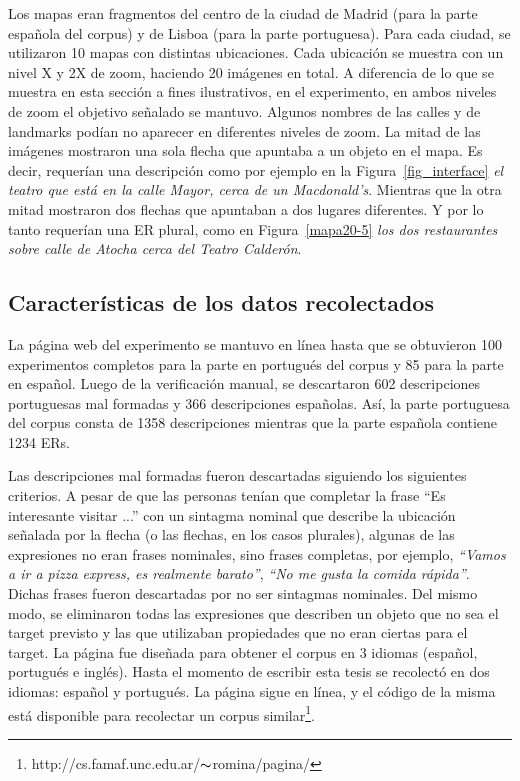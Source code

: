 Los mapas eran fragmentos del centro de la ciudad de Madrid (para la parte espa\~nola del corpus) y de Lisboa (para la parte portuguesa).
Para cada ciudad, se utilizaron 10 mapas con distintas ubicaciones. Cada ubicaci\'on se muestra con un nivel X y 2X de zoom, haciendo 20 im\'agenes en total. 
A diferencia de lo que se muestra en esta secci\'on a fines ilustrativos, en el experimento, en ambos niveles de zoom el objetivo se\~{n}alado se mantuvo. Algunos nombres de las calles y de landmarks pod\'{i}an no aparecer en diferentes niveles de zoom.
La mitad de las im\'agenes mostraron una sola flecha que apuntaba a un objeto en el mapa. Es decir, requer\'{i}an una descripci\'on como por ejemplo en la Figura~\ref{fig_interface} {\it el teatro que est\'a en la calle Mayor, cerca de un Macdonald's}. Mientras que la otra mitad mostraron dos flechas que apuntaban a dos lugares diferentes. Y por lo tanto requer\'ian una ER plural, como en Figura~\ref{mapa20-5} {\it los dos restaurantes sobre calle de Atocha cerca del Teatro Calder\'on}.


\subsection{Caracter\'isticas de los datos recolectados}
\label{sec:datos_recolectados}

La p\'agina web del experimento se mantuvo en l\'{i}nea hasta que se obtuvieron 100 experimentos completos para la parte en portugu\'es del corpus y 85  para la parte en espa\~nol. Luego de la verificaci\'on manual, se descartaron 602 descripciones portuguesas mal formadas y 366 descripciones espa\~nolas. As\'{i}, la parte portuguesa del corpus consta de 1358 descripciones mientras que la parte espa\~nola contiene 1234 ERs. 

Las descripciones mal formadas fueron descartadas siguiendo los siguientes criterios. A pesar de que las personas ten\'{i}an que completar la frase ``Es interesante visitar ...'' con un sintagma nominal que describe la ubicaci\'on se\~nalada por la flecha (o las flechas, en los casos plurales), algunas de las expresiones no eran frases nominales, sino frases completas, por ejemplo, \emph{``Vamos a ir a pizza express, es realmente barato''}, \emph{``No me gusta la comida r\'apida''}. Dichas frases fueron descartadas por no ser sintagmas nominales. Del mismo modo, se eliminaron todas las expresiones que describen un objeto que no sea el target previsto y las que utilizaban propiedades que no eran ciertas para el target. La p\'agina fue dise\~nada para obtener el corpus en 3 idiomas (espa\~nol, portugu\'es e ingl\'es). Hasta el momento de escribir esta tesis se recolect\'o en dos idiomas: espa\~nol y portugu\'es. La p\'agina sigue en l\'inea, y el c\'odigo de la misma est\'a disponible para recolectar un corpus similar\footnote{http://cs.famaf.unc.edu.ar/$\thicksim$romina/pagina/}.


